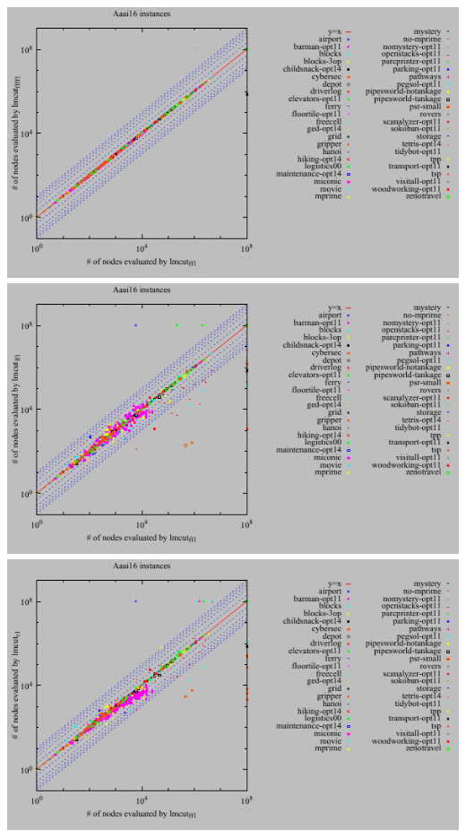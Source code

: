 \includegraphics{tables/aaai16-evaluated-lmcut_ff-lmcut_ffff.pdf}
\linebreak
\includegraphics{tables/aaai16-evaluated-lmcut_ff-lmcut_lf.pdf}
\linebreak
\includegraphics{tables/aaai16-evaluated-lmcut_ff-lmcut_r.pdf}
\linebreak
